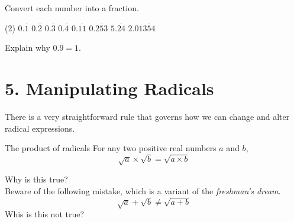 \documentclass[12pt,fleqn]{book}
\newcommand{\prb}[1]{\begin{Exercise}#1\end{Exercise}}
\begin{document}
\prb{Convert each number into a fraction.
    \begin{tasks}(2)
        \task $0.\overline 1$ \vspace{1.5in}
        \task $0.\overline 2$ \vspace{1.5in}
        \task $0.\overline 3$ \vspace{1.5in}
        \task $0.\overline 4$ \vspace{1.5in}
        \task $0.\overline{11}$ \vspace{1.5in}
        \task $0.\overline{253}$ \vspace{1.5in}
        \task $5.\overline{24}$ \vspace{1.5in}
        \task $2.01\overline{354}$ \vspace{1.5in}
    \end{tasks}}
\prb{
    Explain why $0.\overline{9}=1$.
}
\chapter{5. Manipulating Radicals}
There is a very straightforward rule that governs how we can change and alter radical expressions.
\begin{thm}{The product of radicals}{}
    For any two positive real numbers $a$ and $b$,
    \[
        \sqrt a \times \sqrt b = \sqrt{a\times b}
    \]
\end{thm}
Why is this true?
\\[2in]
Beware of the following mistake, which is a variant of the \emph{freshman's dream}.
\[
    \sqrt a + \sqrt b \ne \sqrt{a + b}
\]
Whis is this not true?
\clearpage
\end{document}
